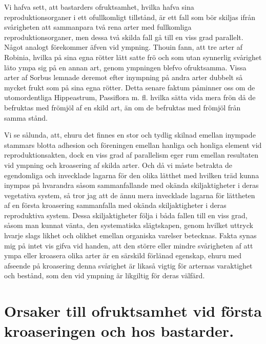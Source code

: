 Vi hafva sett, att bastarders ofruktsamhet, hvilka hafva sina reproduktionsorganer i ett ofullkomligt tillstånd, är ett fall som bör skiljas ifrån svårigheten att sammanpara två rena arter med fullkomliga reproduktionsorganer, men dessa två skilda fall gå till en viss grad parallelt. Något analogt förekommer äfven vid ympning. Thouin fann, att tre arter af Robinia, hvilka på sina egna rötter lätt satte frö och som utan synnerlig svårighet läto ympa sig på en annan art, genom ympningen blefvo ofruktsamma. Vissa arter af Sorbus lemnade deremot efter inympning på andra arter dubbelt så mycket frukt som på sina egna rötter. Detta senare faktum påminner oss om de utomordentliga Hippeastrum, Passiflora m. fl. hvilka sätta vida mera frön då de befruktas med frömjöl af en skild art, än om de befruktas med frömjöl från samma stånd.

Vi se sålunda, att, ehuru det finnes en stor och tydlig skilnad emellan inympade stammars blotta adhesion och föreningen emellan hanliga och honliga element vid reproduktionsakten, dock en viss grad af parallelism eger rum emellan resultaten vid ympning och kroasering af skilda arter. Och då vi måste betrakta de egendomliga och invecklade lagarna för den olika lätthet med hvilken träd kunna inympas på hvarandra såsom sammanfallande med okända skiljaktigheter i deras vegetativa system, så tror jag att de ännu mera invecklade lagarna för lättheten af en första kroasering sammanfalla med okända skiljaktigheter i deras reproduktiva system. Dessa skiljaktigheter följa i båda fallen till en viss grad, såsom man kunnat vänta, den systematiska slägtskapen, genom hvilket uttryck hvarje slags likhet och olikhet emellan organiska varelser betecknas. Fakta synas mig på intet vis gifva vid handen, att den större eller mindre svårigheten af att ympa eller kroasera olika arter är en särskild förlänad egenskap, ehuru med afseende på kroasering denna svårighet är likaså vigtig för arternas varaktighet och bestånd, som den vid ympning är likgiltig för deras välfärd.



\section[Orsaker till ofruktsamhet]{Orsaker till ofruktsamhet vid första kroaseringen och
hos bastarder.}

